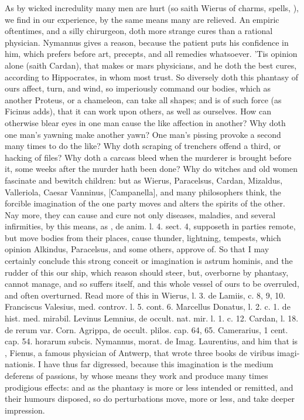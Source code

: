 {{As by wicked incredulity many men are hurt (so saith Wierus of
charms, spells, \etc{}), we find in our experience, by the same means many
are relieved. An empiric oftentimes, and a silly chirurgeon, doth more
strange cures than a rational physician. Nymannus gives a reason,
because the patient puts his confidence in him,  which \Avicenna{}
prefers before art, precepts, and all remedies whatsoever. 'Tis opinion
alone (saith Cardan), that makes or mars physicians, and he doth
the best cures, according to Hippocrates, in whom most trust. So
diversely doth this phantasy of ours affect, turn, and wind, so
imperiously command our bodies, which as another Proteus, or a
chameleon, can take all shapes; and is of such force (as Ficinus adds),
that it can work upon others, as well as ourselves. How can otherwise
blear eyes in one man cause the like affection in another? Why doth one
man's yawning make another yawn? One man's pissing provoke a
second many times to do the like? Why doth scraping of trenchers offend
a third, or hacking of files? Why doth a carcass bleed when the
murderer is brought before it, some weeks after the murder hath been
done? Why do witches and old women fascinate and bewitch children: but
as Wierus, Paracelsus, Cardan, Mizaldus, Valleriola, Caesar Vanninus,
[Campanella], and many philosophers think, the forcible imagination of
the one party moves and alters the spirits of the other. Nay more, they
can cause and cure not only diseases, maladies, and several
infirmities, by this means, as \Avicenna{}, de anim. l. 4. sect. 4,
supposeth in parties remote, but move bodies from their places, cause
thunder, lightning, tempests, which opinion Alkindus, Paracelsus, and
some others, approve of. So that I may certainly conclude this strong
conceit or imagination is astrum hominis, and the rudder of this our
ship, which reason should steer, but, overborne by phantasy, cannot
manage, and so suffers itself, and this whole vessel of ours to be
overruled, and often overturned. Read more of this in \textlatin{Wierus, l. 3. de
Lamiis, c. 8, 9, 10. Franciscus Valesius, med. controv. l. 5. cont. 6.
Marcellus Donatus, l. 2. c. 1. de hist. med. mirabil. Levinus Lemnius,
de occult. nat. mir. l. 1. c. 12. Cardan, l. 18. de rerum var. Corn.
Agrippa, de occult. plilos. cap. 64, 65. Camerarius, 1 cent. cap. 54.
horarum subcis. Nymannus, morat. de Imag.} Laurentius, and him that is
, Fienus, a famous physician of Antwerp, that wrote three
books \textlatin{de viribus imaginationis}. I have thus far digressed, because this
imagination is the medium deferens of passions, by whose means they
work and produce many times prodigious effects: and as the phantasy is
more or less intended or remitted, and their humours disposed, so do
perturbations move, more or less, and take deeper impression.

}}
